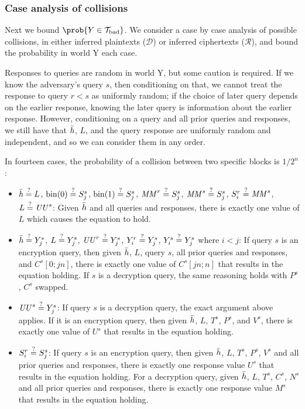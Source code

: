\documentclass[hctr2.tex]{subfiles}
\begin{document}
\subsubsection{Case analysis of collisions}
Next we bound \(\prob{Y \in \Tb}\).
We consider a case by case analysis of possible collisions,
in either inferred plaintexts (\(\mathcal{D}\))
or inferred ciphertexts (\(\mathcal{R}\)),
and bound the probability in world Y each case.

Responses to queries are random in world Y,
but some caution is required.
If we know the adversary's query \(s\), then conditioning on that,
we cannot treat the response to query \(r < s\) as uniformly random;
if the choice of later query depends on the earlier response,
knowing the later query is information about the earlier response.
However, conditioning on a query and all prior queries and responses,
we still have that \(\bar{h}\), \(L\), and the
query response are uniformly random and independent,
and so we can consider them in any order.

In fourteen cases, the probability of a collision
between two specific blocks is \(1/2^n\):


\begin{itemize}
    \item
    \(\bar{h} \stackrel{\text{?}}{=} L\),
    \(\operatorname{bin}(0) \stackrel{\text{?}}{=} S_j^s\),
    \(\operatorname{bin}(1) \stackrel{\text{?}}{=} S_j^s\),
    \(\mathit{MM}^r \stackrel{\text{?}}{=} S_j^s\),
    \(\mathit{MM}^s \stackrel{\text{?}}{=} S_j^s\),
    \(S_i^r \stackrel{\text{?}}{=} \mathit{MM}^s\),
    \(L \stackrel{\text{?}}{=} \mathit{UU}^s\):
    Given \(\bar{h}\) and all queries and responses,
    there is exactly one value of \(L\)
    which causes the equation to hold.
    \item
    \(\bar{h} \stackrel{\text{?}}{=} Y_j^s\),
    \(L \stackrel{\text{?}}{=} Y_j^s\),
    \(\mathit{UU}^r \stackrel{\text{?}}{=} Y_j^s\),
    \(Y_i^r \stackrel{\text{?}}{=} Y_j^s\),
    \(Y_i^s \stackrel{\text{?}}{=} Y_j^s\) where \(i < j\): 
    If query \(s\) is an encryption query,
    then given \(\bar{h}\), \(L\), query \(s\), 
    all prior queries and responses, and
    \(C^s[0;jn]\), there is exactly one value of
    \(C^s[jn;n]\) that results in the equation holding.
    If \(s\) is a decryption query, the same reasoning holds
    with \(P^s\), \(C^s\) swapped.
    \item 
    \(\mathit{UU}^s \stackrel{\text{?}}{=} Y_j^s\):
    If query \(s\) is a decryption query,
    the exact argument above applies.
    If it is an encryption query,
    then given \(\bar{h}\), \(L\), \(T^s\), \(P^s\),
    and \(V^s\), there is exactly
    one value of \(U^s\) that results
    in the equation holding.
    \item 
    \(S_i^r \stackrel{\text{?}}{=} S_j^s\):
    If query \(s\) is an encryption query,
    then given \(\bar{h}\), \(L\), \(T^s\),
    \(P^s\), \(V^s\)
    and all prior queries and responses,
    there is exactly one response value \(U^s\)
    that results in the equation holding.
    For a decryption query, 
    given \(\bar{h}\), \(L\), \(T^s\),
    \(C^s\), \(N^s\)
    and all prior queries and responses,
    there is exactly one response value \(M^s\)
    that results in the equation holding.
\end{itemize}
\end{document}
